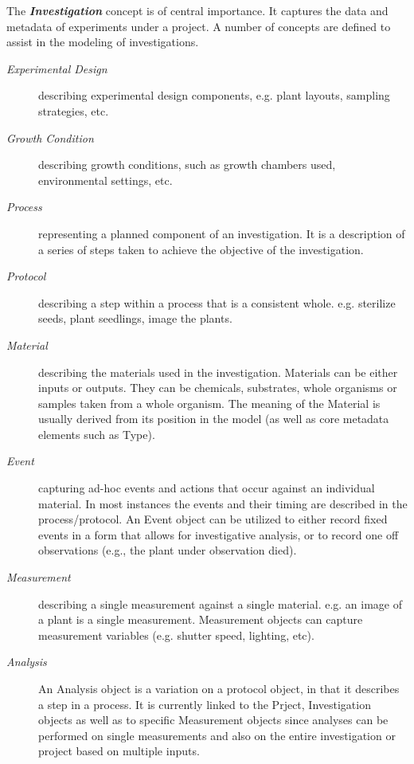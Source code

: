 \documentclass{llncs}
\begin{document}
The \textbf{\emph{Investigation}} concept is of central importance.
It captures the data and metadata of experiments under a project. A
number of concepts are defined to assist in the modeling of
investigations.

\begin{description}
\item[\emph{Experimental Design}] describing experimental design
components, e.g. plant layouts, sampling strategies, etc.

\item[\emph{Growth Condition}] describing growth conditions, such as
growth chambers used, environmental settings, etc.

\item[\emph{Process}] representing a planned component of an
investigation. It is a description of a series of steps taken to
achieve the objective of the investigation.

\item[\emph{Protocol}] describing a step within a process that is a
consistent whole. e.g. sterilize seeds, plant seedlings, image the
plants.

\item[\emph{Material}] describing the materials used in the
investigation. Materials can be either inputs or outputs. They can
be chemicals, substrates, whole organisms or samples taken from a
whole organism. The meaning of the Material is usually derived from
its position in the model (as well as core metadata elements such as
Type).

\item[\emph{Event}] capturing ad-hoc events and actions that occur
against an individual material. In most instances the events and
their timing are described in the process/protocol. An Event object
can be utilized to either record fixed events in a form that allows
for investigative analysis, or to record one off observations (e.g., the
plant under observation died).

\item[\emph{Measurement}] describing a single measurement against a
single material. e.g. an image of a plant is a single measurement.
Measurement objects can capture measurement variables (e.g. shutter
speed, lighting, etc).

\item[\emph{Analysis}] An Analysis object is a variation on a
protocol object, in that it describes a step in a process. It is
currently linked to the Prject, Investigation objects as well as to
specific Measurement objects since analyses can be performed on
single measurements and also on the entire investigation or project
based on multiple inputs.
\end{description}
\end{document}
